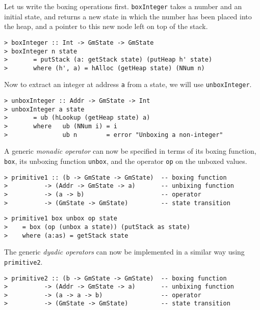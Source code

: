 Let us write the boxing operations first. \mbox{\tt boxInteger} takes a number
and an initial state, and returns a new state in which the number has
been placed into the heap, and a pointer to this new node left on top
of the stack.
\begin{verbatim}
> boxInteger :: Int -> GmState -> GmState
> boxInteger n state
>       = putStack (a: getStack state) (putHeap h' state)
>       where (h', a) = hAlloc (getHeap state) (NNum n)
\end{verbatim}
%
%
\par
Now to extract an integer at address \mbox{\tt a} from a state, we will use
\mbox{\tt unboxInteger}.
\begin{verbatim}
> unboxInteger :: Addr -> GmState -> Int
> unboxInteger a state
>       = ub (hLookup (getHeap state) a)
>       where   ub (NNum i) = i
>               ub n        = error "Unboxing a non-integer"
\end{verbatim}
%
%
\par
A generic {\em monadic operator\/} can now be
specified in terms of its boxing function, \mbox{\tt box}, its unboxing
function \mbox{\tt unbox}, and the operator \mbox{\tt op} on the unboxed values.
\begin{verbatim}
> primitive1 :: (b -> GmState -> GmState)  -- boxing function
>          -> (Addr -> GmState -> a)       -- unbixing function
>          -> (a -> b)                     -- operator
>          -> (GmState -> GmState)         -- state transition
\end{verbatim}
%
\begin{verbatim}
> primitive1 box unbox op state
>    = box (op (unbox a state)) (putStack as state)
>    where (a:as) = getStack state
\end{verbatim}
%
\par
The generic {\em dyadic operators\/}
can now be implemented in a similar way using \mbox{\tt primitive2}.
\begin{verbatim}
> primitive2 :: (b -> GmState -> GmState)  -- boxing function
>          -> (Addr -> GmState -> a)       -- unbixing function
>          -> (a -> a -> b)                -- operator
>          -> (GmState -> GmState)         -- state transition
\end{verbatim}
